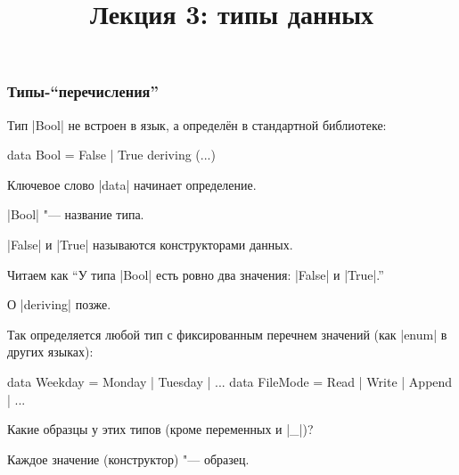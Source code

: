 \documentclass[10pt]{beamer}
\title{Лекция 3: типы данных}
\begin{document}
\begin{frame}[plain]
  \maketitle
\end{frame}

\begin{frame}[fragile]
  \frametitle{Типы-\enquote{перечисления}}
  \begin{itemize}
    \item Тип \haskinline|Bool| не встроен в язык, а определён в стандартной библиотеке:
          \begin{haskell}
            data Bool = False | True deriving (...)
          \end{haskell}
    \item Ключевое слово \haskinline|data| начинает определение.
    \item \haskinline|Bool| "--- название типа.
    \item \haskinline|False| и \haskinline|True| называются конструкторами данных.
    \item Читаем как \enquote{У типа \haskinline|Bool| есть ровно два значения: \haskinline|False| и \haskinline|True|.}
           { \item О \haskinline|deriving| позже. }
          \pause
    \item Так определяется любой тип с фиксированным перечнем значений (как \haskinline|enum| в других языках):
          \begin{haskell}
            data Weekday = Monday | Tuesday | ...
            data FileMode = Read | Write | Append | ...
          \end{haskell}
    \item Какие образцы у этих типов (кроме переменных и \haskinline|_|)? \pause
    \item Каждое значение (конструктор) "--- образец.
  \end{itemize}
\end{frame}
\end{document}
